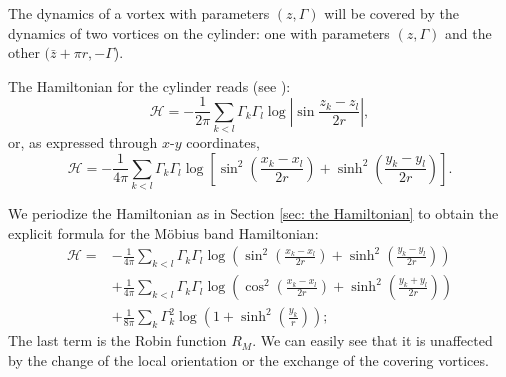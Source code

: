 \documentclass[11pt,twoside]{article}
\theoremstyle{definition}
\numberwithin{equation}{section}
\begin{document}
The dynamics of a vortex with parameters $(z,\Gamma)$ will be covered by the dynamics of two vortices on the cylinder:  one with parameters $(z,\Gamma)$  and the other $(\bar{z} + \pi r,-\Gamma$). 

The Hamiltonian for the cylinder reads (see \cite{montaldi2003vortex}):
      \begin{equation*}
          \mathcal{H} = -\frac{1}{2\pi}\sum_{k<l} \Gamma_k \Gamma_l \log\left|\sin \frac{z_k-z_l}{2r}\right|,
      \end{equation*}
      or, as expressed through $x$-$y$ coordinates,
      \begin{equation*}
          \mathcal{H} = -\frac{1}{4\pi}\sum_{k<l}\Gamma_k\Gamma_l\log\left[\sin^2\left(\frac{x_k-x_l}{2r}\right) + \sinh^2\left(\frac{y_k-y_l}{2r}\right)\right].
      \end{equation*}
      
     We periodize the Hamiltonian  as in Section \ref{sec: the Hamiltonian} to obtain the explicit formula for the M\"obius band Hamiltonian:
           \begin{equation}
           \label{Ham}
      \begin{split}
          \mathcal{H} =& -\frac{1}{4\pi}\sum\limits_{k<l}\Gamma_k\Gamma_l\log\left(\sin^2\left(\frac{x_k-x_l}{2r}\right)+ \sinh^2\left(\frac{y_k-y_l}{2r}\right)\right)  \\
 &+\frac{1}{4\pi}\sum\limits_{k<l}\Gamma_k\Gamma_l\log\left(\cos^2\left(\frac{x_k-x_l}{2r}\right)+ \sinh^2\left(\frac{y_k+y_l}{2r}\right)\right)\\
          &+\frac{1}{8\pi}\sum\limits_{k}\Gamma_k^2\log\left(1+ \sinh^2\left(\frac{y_k}{r}\right)\right);
          \end{split}
      \end{equation}
     The last term is the Robin function $R_M$. We can easily see that it is unaffected by the change of the local orientation or the exchange of the covering vortices.

   
\end{document}
